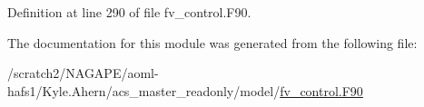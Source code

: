 Definition at line 290 of file fv\-\_\-control.\-F90.



The documentation for this module was generated from the following file\-:\begin{DoxyCompactItemize}
\item 
/scratch2/\-N\-A\-G\-A\-P\-E/aoml-\/hafs1/\-Kyle.\-Ahern/acs\-\_\-master\-\_\-readonly/model/\hyperlink{fv__control_8F90}{fv\-\_\-control.\-F90}\end{DoxyCompactItemize}
